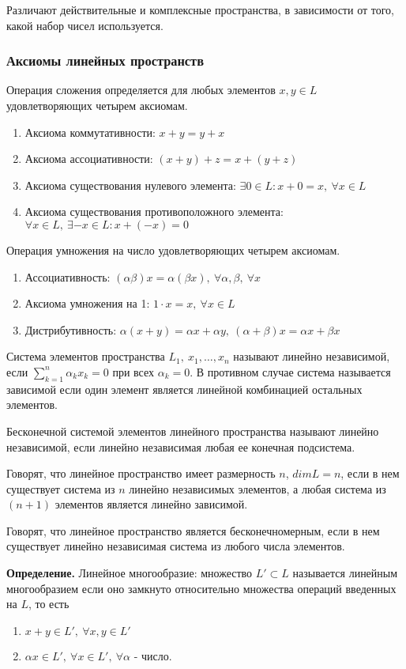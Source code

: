 \documentclass[14pt]{extarticle}
\theoremstyle{definition}
\theoremstyle{remark}
\newcommand{\be}{\begin{enumerate}}
\newcommand{\ee}{\end{enumerate}}
\renewcommand{\[}{\begin{dmath*}[compact]}
\renewcommand{\]}{\end{dmath*}}
\newcommand{\sep}{ , \ \allowbreak }
\newcommand{\tdef}{\textbf{Определение.} }
\begin{document}
Различают действительные и комплексные пространства, в зависимости от того, какой набор чисел используется.

\subsubsection{Аксиомы линейных пространств}

Операция сложения определяется для любых элементов $x,y \in L$ удовлетворяющих четырем аксиомам.

\be
  \item Аксиома коммутативности: $x+y = y+x$
  \item Аксиома ассоциативности: $(x+y)+z = x+(y+z)$
  \item Аксиома существования нулевого элемента: $\exists 0 \in L: x+0=x \sep \forall x \in L$
  \item Аксиома существования противоположного элемента: $\forall x \in L \sep \exists -x \in L: x+(-x)=0$
\ee

Операция умножения на число удовлетворяющих четырем аксиомам.
\be
  \item Ассоциативность: $(\alpha \beta) x = \alpha (\beta x) \sep \forall \alpha, \beta \sep \forall x$
  \item Аксиома умножения на 1: $1\cdot x = x \sep \forall x \in L$
  \item Дистрибутивность: $\alpha (x+y)=\alpha x + \alpha y \sep (\alpha+\beta)x=\alpha x + \beta x$
\ee

Система элементов пространства $L_1 \sep x_1, \dots, x_n$ называют линейно независимой, если $\sum_{k=1}^n \alpha_k x_k = 0$ при всех $\alpha_k = 0$. В противном случае система называется зависимой если один элемент является линейной комбинацией остальных элементов.

Бесконечной системой элементов линейного пространства называют линейно независимой, если линейно независимая любая ее конечная подсистема.

Говорят, что линейное пространство имеет размерность $n$, $dim L=n$, если в нем существует система из $n$ линейно независимых элементов, а любая система из $(n+1)$ элементов является линейно зависимой.

Говорят, что линейное пространство является бесконечномерным, если в нем существует линейно независимая система из любого числа элементов.

\tdef Линейное многообразие: множество $L'\subset L$ называется линейным многообразием если оно замкнуто относительно множества операций введенных на $L$, то есть
\be
  \item $x+y \in L' \sep \forall x,y \in L'$
  \item $\alpha x \in L' \sep \forall x \in L' \sep \forall \alpha$ - число.
\ee
\end{document}
